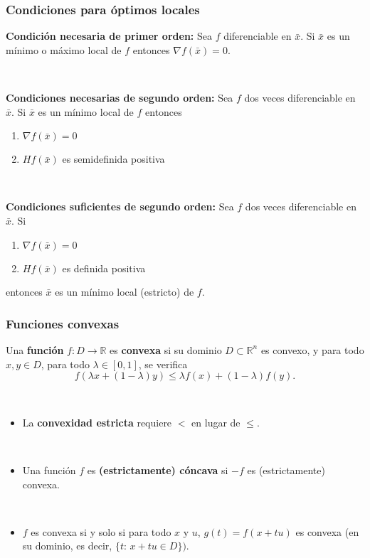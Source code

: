 \documentclass{beamer}
\begin{document}
\begin{frame}
\frametitle{Condiciones para óptimos locales}

\textbf{Condición necesaria de primer orden:} Sea $f$  diferenciable en $\bar{x}$. Si $\bar{x}$ es un mínimo o máximo local de $f$ entonces $\nabla f(\bar{x})=0$.

\

\textbf{Condiciones necesarias de segundo orden:} Sea $f$  dos veces diferenciable en $\bar{x}$. Si $\bar{x}$ es un mínimo local de $f$ entonces
\begin{enumerate}
\item  $\nabla f(\bar{x})=0$
\item  $Hf(\bar{x})$ es semidefinida positiva
\end{enumerate}

\

\textbf{Condiciones suficientes de segundo orden:} Sea $f$  dos veces diferenciable en $\bar{x}$. Si 
\begin{enumerate}
\item  $\nabla f(\bar{x})=0$
\item  $Hf(\bar{x})$ es definida positiva
\end{enumerate}
entonces $\bar{x}$ es un mínimo local (estricto) de $f$.

\end{frame}
\begin{frame}
\frametitle{Funciones convexas}

Una \textbf{función} $f:D\to \mathbb{R}$ es \textbf{convexa} si su dominio $D\subset\mathbb{R}^n$ es convexo, y para todo $x, y\in D$, para todo $\lambda\in [0,1]$, se verifica 
\[
f(\lambda x + (1-\lambda) y)\leq \lambda f(x) + (1-\lambda) f(y).
\]

\

\begin{itemize}
\item La \textbf{convexidad estricta} requiere $<$ en lugar de $\leq$.

\

\item Una función $f$ es \textbf{(estrictamente) cóncava} si $-f$ es (estrictamente) convexa.

\

\item $f$ es convexa si y solo si para todo $x$ y $u$, $g(t)=f(x+tu)$ es convexa (en su dominio, es decir, $\{t:\, x+tu\in D\})$.  
\end{itemize}


\end{frame}
\end{document}
